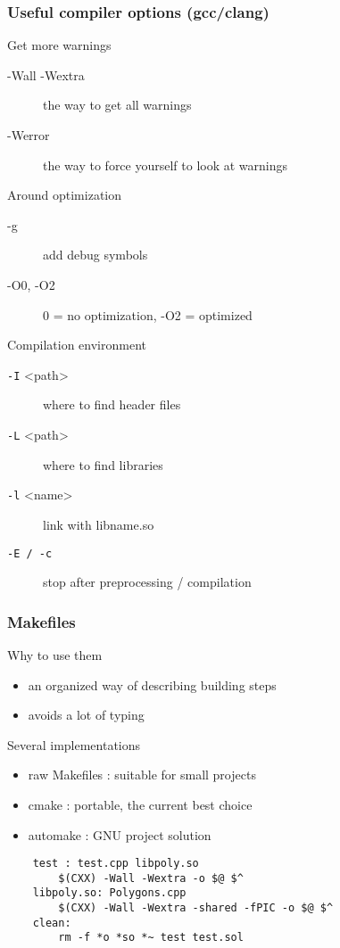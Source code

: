 \begin{frame}[fragile]
  \frametitle{Useful compiler options (gcc/clang)}
  \begin{block}{Get more warnings}
    \begin{description}
      \item[-Wall -Wextra] the way to get all warnings
      \item[-Werror] the way to force yourself to look at warnings
    \end{description}
  \end{block}
  \begin{block}{Around optimization}
    \begin{description}
      \item[-g] add debug symbols
      \item[-O0, -O2] 0 = no optimization, -O2 = optimized
    \end{description}
  \end{block}
  \begin{block}{Compilation environment}
    \begin{description}
      \item[\texttt{-I} \textless{}path\textgreater] where to find header files
      \item[\texttt{-L} \textless{}path\textgreater] where to find libraries
      \item[\texttt{-l} \textless{}name\textgreater] link with libname.so
      \item[\texttt{-E / -c}] stop after preprocessing / compilation
    \end{description}
  \end{block}
\end{frame}

\begin{frame}[fragile]
  \frametitle{Makefiles}
  \begin{block}{Why to use them}
    \begin{itemize}
    \item an organized way of describing building steps
    \item avoids a lot of typing
    \end{itemize}
  \end{block}
  \begin{block}{Several implementations}
    \begin{itemize}
    \item raw Makefiles : suitable for small projects
    \item cmake : portable, the current best choice
    \item automake : GNU project solution
      \end{itemize}
  \end{block}
  \begin{verbatim}
    test : test.cpp libpoly.so
        $(CXX) -Wall -Wextra -o $@ $^
    libpoly.so: Polygons.cpp
        $(CXX) -Wall -Wextra -shared -fPIC -o $@ $^
    clean:
        rm -f *o *so *~ test test.sol
  \end{verbatim}
\end{frame}

